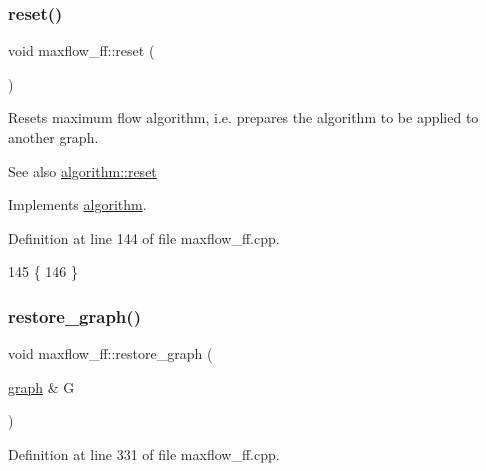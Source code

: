 \subsubsection{\texorpdfstring{reset()}{reset()}}
{\footnotesize\ttfamily void maxflow\+\_\+ff\+::reset (\begin{DoxyParamCaption}{ }\end{DoxyParamCaption})\hspace{0.3cm}{\ttfamily [virtual]}}

Resets maximum flow algorithm, i.\+e. prepares the algorithm to be applied to another graph.

\begin{DoxySeeAlso}{See also}
\mbox{\hyperlink{classalgorithm_a21aba63d066ae7897de6ca7d8425c408}{algorithm\+::reset}} 
\end{DoxySeeAlso}


Implements \mbox{\hyperlink{classalgorithm_a21aba63d066ae7897de6ca7d8425c408}{algorithm}}.



Definition at line 144 of file maxflow\+\_\+ff.\+cpp.


\begin{DoxyCode}
145 \{
146 \}
\end{DoxyCode}
\mbox{\label{classmaxflow__ff_a31a13c79918964a49fa18b4eb514c584}} 
\subsubsection{\texorpdfstring{restore\+\_\+graph()}{restore\_graph()}}
{\footnotesize\ttfamily void maxflow\+\_\+ff\+::restore\+\_\+graph (\begin{DoxyParamCaption}\item[{\mbox{\hyperlink{classgraph}{graph}} \&}]{G }\end{DoxyParamCaption})\hspace{0.3cm}{\ttfamily [protected]}}



Definition at line 331 of file maxflow\+\_\+ff.\+cpp.


